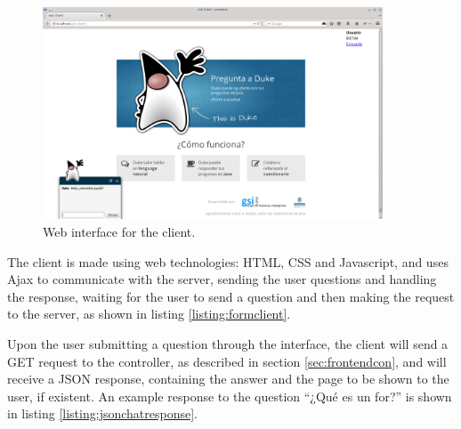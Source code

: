 \begin{figure}[!htbp]
    \centering
    \includegraphics[width=0.9\textwidth]{img/screens/ask-client.png}
    \caption{Web interface for the client.}
    \label{fig:chat1}
\end{figure}

The client is made using web technologies: HTML, CSS and Javascript, and uses Ajax to communicate with the server, sending the user questions and handling the response, waiting for the user to send a question and then making the request to the server, as shown in listing \ref{listing:formclient}.


\begin{center}
  
\end{center}

Upon the user submitting a question through the interface, the client will send a GET request to the controller, as described in section \ref{sec:frontendcon}, and will receive a JSON response, containing the answer and the page to be shown to the user, if existent. An example response to the question ``¿Qué es un for?'' is shown in listing \ref{listing:jsonchatresponse}.

